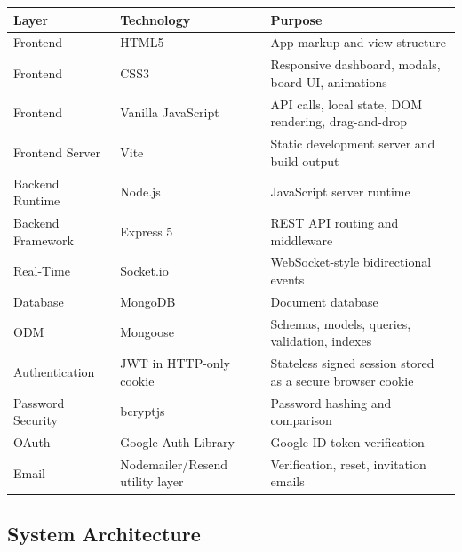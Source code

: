 \documentclass[
]{article}
\begin{document}
{\def\LTcaptype{} %
\begin{longtable}[]{@{}
  >{\raggedright\arraybackslash}p{}
  >{\raggedright\arraybackslash}p{}
  >{\raggedright\arraybackslash}p{}@{}}
\toprule\noalign{}
\begin{minipage}[b]{\linewidth}\raggedright
Layer
\end{minipage} & \begin{minipage}[b]{\linewidth}\raggedright
Technology
\end{minipage} & \begin{minipage}[b]{\linewidth}\raggedright
Purpose
\end{minipage} \\
\midrule\noalign{}
\endhead
\bottomrule\noalign{}
\endlastfoot
Frontend & HTML5 & App markup and view structure \\
Frontend & CSS3 & Responsive dashboard, modals, board UI, animations \\
Frontend & Vanilla JavaScript & API calls, local state, DOM rendering,
drag-and-drop \\
Frontend Server & Vite & Static development server and build output \\
Backend Runtime & Node.js & JavaScript server runtime \\
Backend Framework & Express 5 & REST API routing and middleware \\
Real-Time & Socket.io & WebSocket-style bidirectional events \\
Database & MongoDB & Document database \\
ODM & Mongoose & Schemas, models, queries, validation, indexes \\
Authentication & JWT in HTTP-only cookie & Stateless signed session
stored as a secure browser cookie \\
Password Security & bcryptjs & Password hashing and comparison \\
OAuth & Google Auth Library & Google ID token verification \\
Email & Nodemailer/Resend utility layer & Verification, reset,
invitation emails \\
\end{longtable}
}

\subsection{System Architecture}\label{system-architecture}
\end{document}
